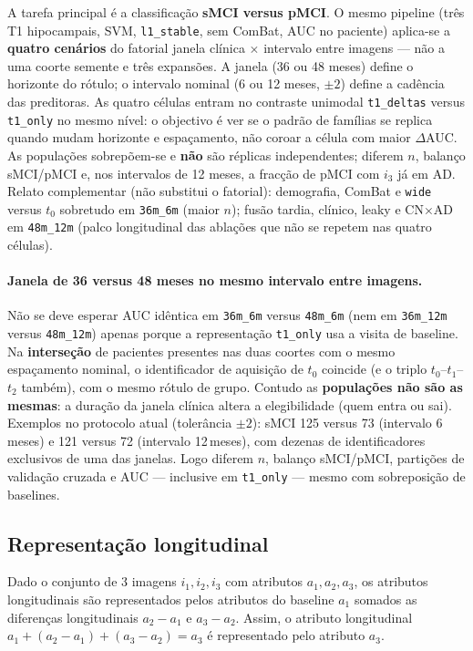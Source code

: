 \documentclass[review]{elsarticle}
\newcommand{\code}[1]{\texttt{#1}}
\begin{document}
	A tarefa principal é a classificação \textbf{sMCI versus pMCI}.
	O mesmo pipeline (três T1 hipocampais, SVM, \code{l1\_stable}, sem ComBat, AUC no paciente) aplica-se a \textbf{quatro cenários} do fatorial janela clínica $\times$ intervalo entre imagens --- não a uma coorte semente e três expansões.
	A janela (36 ou 48 meses) define o horizonte do rótulo; o intervalo nominal (6 ou 12 meses, $\pm 2$) define a cadência das preditoras.
	As quatro células entram no contraste unimodal \code{t1\_deltas} versus \code{t1\_only} no mesmo nível: o objectivo é ver se o padrão de famílias se replica quando mudam horizonte e espaçamento, não coroar a célula com maior $\Delta$AUC.
	As populações sobrepõem-se e \textbf{não} são réplicas independentes; diferem $n$, balanço sMCI/pMCI e, nos intervalos de 12 meses, a fracção de pMCI com $i_3$ já em AD.
	Relato complementar (não substitui o fatorial): demografia, ComBat e \code{wide} versus $t_0$ sobretudo em \code{36m\_6m} (maior $n$); fusão tardia, clínico, leaky e CN$\times$AD em \code{48m\_12m} (palco longitudinal das ablações que não se repetem nas quatro células).

	\paragraph{Janela de 36 versus 48 meses no mesmo intervalo entre imagens.}
	Não se deve esperar AUC idêntica em \code{36m\_6m} versus \code{48m\_6m} (nem em \code{36m\_12m} versus \code{48m\_12m}) apenas porque a representação \code{t1\_only} usa a visita de baseline.
	Na \textbf{interseção} de pacientes presentes nas duas coortes com o mesmo espaçamento nominal, o identificador de aquisição de $t_0$ coincide (e o triplo $t_0$--$t_1$--$t_2$ também), com o mesmo rótulo de grupo.
	Contudo as \textbf{populações não são as mesmas}: a duração da janela clínica altera a elegibilidade (quem entra ou sai).
	Exemplos no protocolo atual (tolerância $\pm 2$): sMCI 125 versus 73 (intervalo 6\,meses) e 121 versus 72 (intervalo 12\,meses), com dezenas de identificadores exclusivos de uma das janelas.
	Logo diferem $n$, balanço sMCI/pMCI, partições de validação cruzada e AUC --- inclusive em \code{t1\_only} --- mesmo com sobreposição de baselines.
	
	\subsection{Representação longitudinal}
	
	Dado o conjunto de 3 imagens $i_1, i_2, i_3$ com atributos $a_1, a_2, a_3$, os atributos longitudinais são representados pelos atributos do baseline $a_1$ somados as diferenças longitudinais $a_2 - a_1$ e $a_3 - a_2$. Assim, o atributo longitudinal $a_1 + (a_2 - a_1) + (a_3 - a_2) = a_3$ é representado pelo atributo $a_3$.
	
\end{document}
